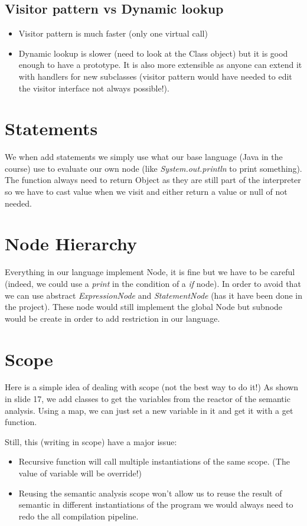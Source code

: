 \subsection{Visitor pattern vs Dynamic lookup}
\begin{itemize}
    \item Visitor pattern is much faster (only one virtual call)
    \item Dynamic lookup is slower (need to look at the Class object) but it is
    good enough to have a prototype. It is also more extensible as anyone can
    extend it with handlers for new subclasses (visitor pattern would have
    needed to edit the visitor interface not always possible!).
\end{itemize}

\section{Statements}
We when add statements we simply use what our base language (Java in the course)
use to evaluate our own node (like \textit{System.out.println} to print
something). The function always need to return Object as they are still part of
the interpreter so we have to cast value when we visit and either return a value
or null of not needed.

\section{Node Hierarchy}
Everything in our language implement Node, it is fine but we have to be careful
(indeed, we could use a \textit{print} in the condition of a \textit{if} node).
In order to avoid that we can use abstract \textit{ExpressionNode} and
\textit{StatementNode} (has it have been done in the project). These node would
still implement the global Node but subnode would be create in order to add
restriction in our language.

\section{Scope}
Here is a simple idea of dealing with scope (not the best way to do it!) As
shown in slide 17, we add classes to get the variables from the reactor of the
semantic analysis. Using a map, we can just set a new variable in it and get it
with a get function.

Still, this (writing in scope) have a major issue:
\begin{itemize}
    \item Recursive function will call multiple instantiations of the same
    scope. (The value of variable will be override!)
    \item Reusing the semantic analysis scope won't allow us to reuse the result
    of semantic in different instantiations of the program we would always need
    to redo the all compilation pipeline.
\end{itemize}

